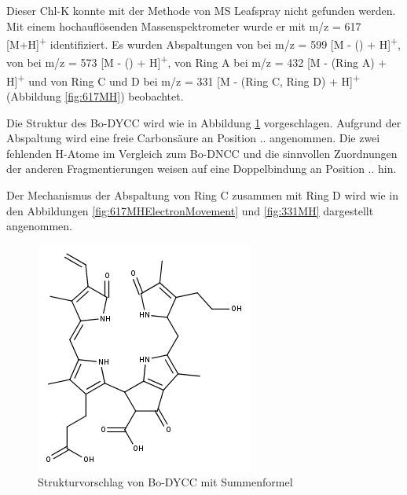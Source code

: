 Dieser \gls{Chl-K} konnte mit der Methode von MS Leafspray nicht gefunden werden. Mit einem hochauflösenden Massenspektrometer wurde er mit m/z = 617 [M+H]\textsuperscript{+} identifiziert. Es wurden Abspaltungen von  bei m/z = 599 [M - () + H]\textsuperscript{+}, von  bei m/z = 573 [M - () + H]\textsuperscript{+}, von Ring A bei m/z = 432 [M - (Ring A) + H]\textsuperscript{+} und von Ring C und D bei m/z = 331 [M - (Ring C, Ring D) + H]\textsuperscript{+} (Abbildung \ref{fig:617MH}) beobachtet.

Die Struktur des Bo-DYCC  wird wie in Abbildung \ref{fig:617MHStruktur} vorgeschlagen. Aufgrund der  Abspaltung wird eine freie Carbonsäure an Position .. angenommen. Die zwei fehlenden H-Atome im Vergleich zum Bo-DNCC und die sinnvollen Zuordnungen der anderen Fragmentierungen weisen auf eine Doppelbindung an Position .. hin.  

Der Mechanismus der Abspaltung von Ring C zusammen mit Ring D wird wie in den Abbildungen \ref{fig:617MHElectronMovement} und \ref{fig:331MH} dargestellt angenommen. 

\begin{figure}[!htbp]
  \centering
  \includegraphics[scale=0.6]{figures/Kapitel7/Kataboliten/fragmentation_structures/VWA_Katabolit_617.png}
  \caption[Strukturvorschlag von Bo-DYCC, Quelle: Autor]{Strukturvorschlag von Bo-DYCC mit Summenformel }
  \label{fig:617MHStruktur}
\end{figure}

